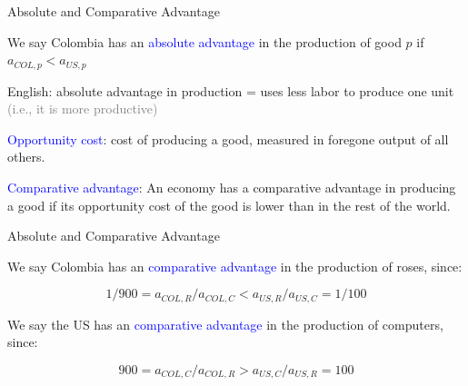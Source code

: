 \documentclass[notes,11pt, aspectratio=169, xcolor=table]{beamer}
\newcommand{\blue}[1]{\textcolor{blue}{#1}}
\newenvironment{wideitemize}{\itemize\addtolength{\itemsep}{10pt}}{\enditemize}
\begin{document}
\begin{frame}{Absolute and Comparative Advantage}

\begin{wideitemize}
    \item We say Colombia has an \textcolor{blue}{absolute advantage} in the production of good $p$ if $a_{COL,p} < a_{US,p}$

    \item English: absolute advantage in production = uses less labor to produce one unit \\
    \qquad \textcolor{gray}{(i.e., it is more productive)}

    \item \textcolor{blue}{Opportunity cost}: cost of producing a good, measured in foregone output of all others.

    \item \blue{Comparative advantage}: An economy has a comparative advantage in producing a good if its opportunity cost of the good is lower than in the rest of the world.

\end{wideitemize}

\end{frame}


\begin{frame}{Absolute and Comparative Advantage}

\begin{wideitemize}

    \item We say Colombia has an \textcolor{blue}{comparative advantage} in the production of roses, since:
    
    \begin{equation*}
        1/900 = a_{COL,R}/a_{COL,C} < a_{US,R}/a_{US,C} = 1/100
    \end{equation*}

    \item We say the US has an \textcolor{blue}{comparative advantage} in the production of computers, since:
    
    \begin{equation*}
        900 = a_{COL,C}/a_{COL,R
        } > a_{US,C}/a_{US,R} = 100
    \end{equation*}

\end{wideitemize}

\end{frame}
\end{document}
